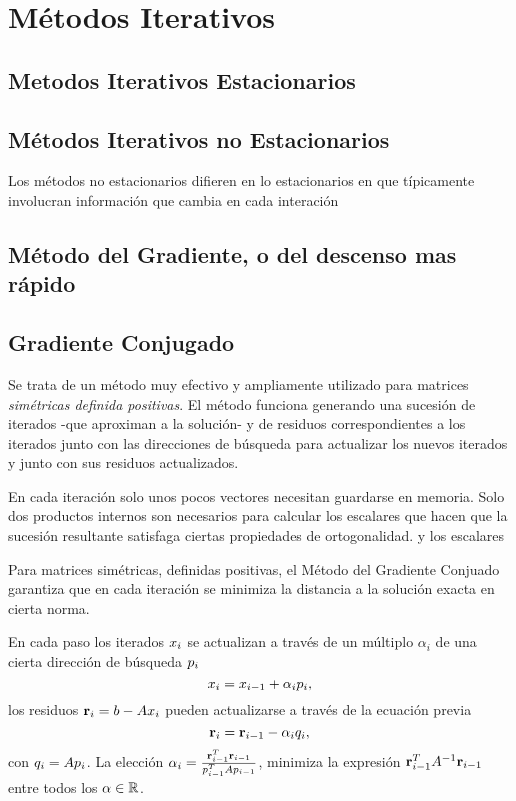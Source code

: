 



\chapter{Métodos Iterativos}
\section{Metodos Iterativos Estacionarios}

\section{M\'etodos Iterativos no Estacionarios}
Los métodos no estacionarios difieren en lo estacionarios en que típicamente involucran información que cambia en cada interación
\section{Método del Gradiente, o del descenso mas rápido}

\section{Gradiente Conjugado}
Se trata de un método muy efectivo y ampliamente utilizado para matrices \emph{simétricas definida positivas}. El método funciona generando una sucesión de iterados -que aproximan a la solución- y de residuos correspondientes a los iterados junto con las direcciones de búsqueda para actualizar los nuevos iterados y junto con sus residuos actualizados.

En cada iteración solo unos pocos vectores necesitan guardarse en memoria. Solo dos productos internos son necesarios para calcular los escalares que hacen que la sucesión resultante satisfaga ciertas propiedades de ortogonalidad. y los escalares

\tcc
Para matrices simétricas, definidas positivas, el Método del Gradiente Conjuado garantiza que en cada iteración se minimiza la distancia a la solución exacta en cierta norma.
\etcc

En cada paso los iterados $\xb_i$ se actualizan a través de un múltiplo $\alpha_i$ de una cierta dirección de  búsqueda $\pb_i$
$$
\xb_i=\xb_{i-1}+\alpha_i\pb_i,
$$
los residuos $\rb_i=\bb-\Ab\xb_i$ pueden actualizarse a través de la ecuación previa
$$
\rb_i=\rb_{i-1}-\alpha_i\qb_i,
$$
con $\qb_i=\Ab\pb_i$.
La elección $\alpha_i=\frac{\rb_{i-1}^T\rb_{i-1}}{\pb_{i-1}^T\Ab\pb_{i-1}}$,
minimiza la expresión $\rb_{i-1}^T\Ab^{-1}\rb_{i-1}$ entre todos los
$\alpha\in \mathbb R$.


